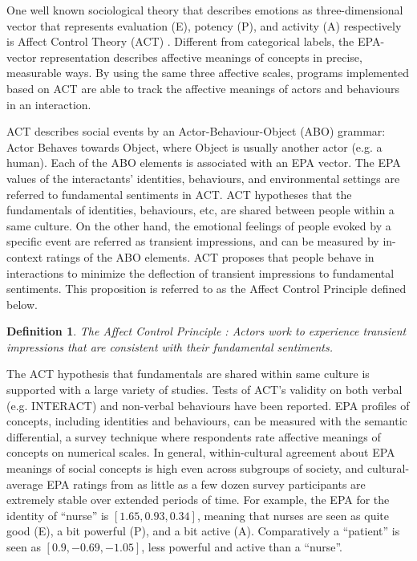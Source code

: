 One well known sociological theory that describes emotions as three-dimensional vector that represents evaluation (E), potency (P), and activity (A) respectively is Affect Control Theory (ACT) \cite{robinson2006affect}. Different from categorical labels, the EPA-vector representation describes affective meanings of concepts in precise, measurable ways. By using the same three affective scales, programs implemented based on ACT are able to track the affective meanings of actors and behaviours in an interaction.

ACT describes social events by an Actor-Behaviour-Object (ABO) grammar: Actor Behaves towards Object, where Object is usually another actor (e.g. a human). Each of the ABO elements is associated with an EPA vector. The EPA values of the interactants' identities, behaviours, and environmental settings are referred to fundamental sentiments in ACT. ACT hypotheses that the fundamentals of identities, behaviours, etc, are shared between people within a same culture. On the other hand, the emotional feelings of people evoked by a specific event are referred as transient impressions, and can be measured by in-context ratings of the ABO elements. ACT proposes that people behave in interactions to minimize the deflection of transient impressions to fundamental sentiments. This proposition is referred to as the Affect Control Principle defined below.

\newtheorem{def-act}{Definition}
\begin{def-act}
\label{def:act}
The Affect Control Principle \cite{robinson2006affect}: Actors work to experience transient impressions that are consistent with their fundamental sentiments.
\end{def-act}

The ACT hypothesis that fundamentals are shared within same culture is supported with a large variety of studies. Tests of ACT's validity on both verbal (e.g. INTERACT) and non-verbal behaviours \cite{schroder2013culture} have been reported. EPA profiles of concepts, including identities and behaviours, can be measured with the semantic differential, a survey technique where respondents rate affective meanings of concepts on numerical scales. In general, within-cultural agreement about EPA meanings of social concepts is high even across subgroups of society, and cultural-average EPA ratings from as little as a few dozen survey participants are extremely stable over extended periods of time. For example, the EPA for the identity of ``nurse'' is $[1.65, 0.93, 0.34]$, meaning that nurses are seen as quite good (E), a bit powerful (P), and a bit active (A). Comparatively a ``patient'' is seen as $[0.9, -0.69, -1.05]$, less powerful and active than a ``nurse''.

